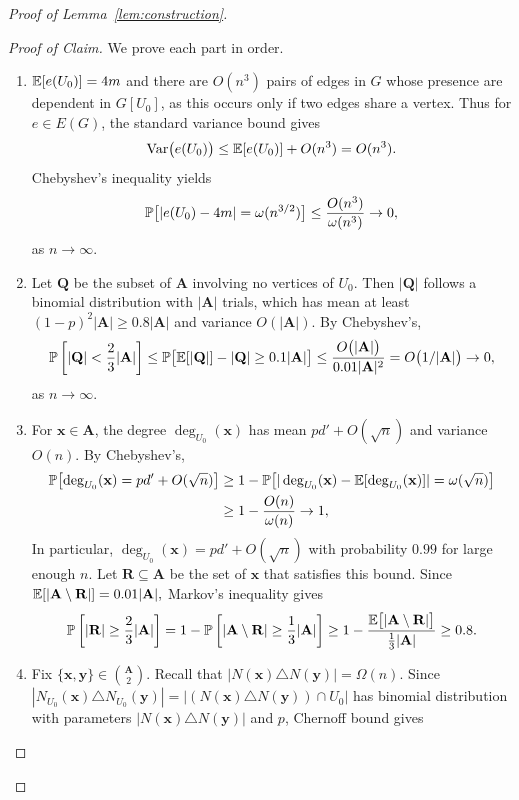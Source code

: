 \begin{proof}[Proof of Lemma~\ref{lem:construction}]
\begin{proof}[Proof of Claim]
  We prove each part in order.
  \begin{enumerate}
    \item[(i)] $\mathbb{E}[e(U_0)] = 4m$ and there are $O(n^3)$ pairs of edges in $G$ whose presence are dependent in $G[U_0]$, as this occurs only if two edges share a vertex. Thus for $e \in E(G)$, the standard variance bound gives
    \[
      \operatorname{Var}\bigl(e(U_0)\bigr) \leq \mathbb{E}[e(U_0)] + O(n^3) = O(n^3).
    \]
    Chebyshev's inequality yields
    \[
      \mathbb{P}\bigl[|e(U_0) - 4m| = \omega(n^{3/2})\bigr] \leq \frac{O(n^3)}{\omega(n^{3})} \to 0,
    \]
    as $n \to \infty$.
    \item[(ii)] Let $\mathbf{Q}$ be the subset of $\mathbf{A}$ involving no vertices of $U_0$. Then $|\mathbf{Q}|$ follows a binomial distribution with $|\mathbf{A}|$ trials, which has mean at least $(1 - p)^2|\mathbf{A}| \geq 0.8|\mathbf{A}|$ and variance $O(|\mathbf{A}|)$. By Chebyshev's,
    \[
      \mathbb{P}\left[|\mathbf{Q}| < \frac{2}{3}|\mathbf{A}|\right] \leq \mathbb{P}\bigl[\mathbb{E}[|\mathbf{Q}|] - |\mathbf{Q}| \geq 0.1|\mathbf{A}|\bigr] \leq \frac{O\bigl(|\mathbf{A}|\bigr)}{0.01|\mathbf{A}|^2} = O\bigl(1/|\mathbf{A}|\bigr) \to 0,
    \]
    as $n \to \infty$. 
    \item[(iii)] For $\mathbf{x} \in \mathbf{A}$, the degree $\deg_{U_0}(\mathbf{x})$ has mean $pd' + O(\sqrt{n})$ and variance $O(n)$. By Chebyshev's, 
    \begin{align*}
      \mathbb{P}\bigl[\operatorname{deg}_{U_0}(\mathbf{x}) = pd' + O(\sqrt{n})\bigr] 
      &\geq 1 - \mathbb{P}\bigl[|\operatorname{deg}_{U_0}(\mathbf{x}) - \mathbb{E}[\operatorname{deg}_{U_0}(\mathbf{x})]| = \omega(\sqrt{n})\bigr] \\
      &\geq 1 - \frac{O(n)}{\omega(n)} \to 1,
    \end{align*}
    In particular, $\deg_{U_0}(\mathbf{x}) = pd' + O(\sqrt{n})$ with probability $0.99$ for large enough $n$. Let $\mathbf{R} \subseteq \mathbf{A}$ be the set of $\mathbf{x}$ that satisfies this bound. Since $\mathbb{E}[|\mathbf{A} \setminus \mathbf{R}|] = 0.01|\mathbf{A}|,$ Markov's inequality gives
    \[
      \mathbb{P}\left[|\mathbf{R}| \geq \frac{2}{3}|\mathbf{A}|\right] = 1 - \mathbb{P}\left[|\mathbf{A} \setminus \mathbf{R}| \geq \frac{1}{3}|\mathbf{A}|\right] \geq 1 - \frac{\mathbb{E}\bigl[|\mathbf{A} \setminus \mathbf{R}|\bigr]}{\frac{1}{3}|\mathbf{A}|} \geq 0.8.
    \]
    \item[(iv)] Fix $\{\mathbf{x}, \mathbf{y}\} \in \binom{\mathbf{A}}{2}$. Recall that $|N(\mathbf{x}) \triangle N(\mathbf{y})| = \Omega(n)$. Since $|N_{U_0}(\mathbf{x}) \triangle N_{U_0}(\mathbf{y})| = |(N(\mathbf{x}) \triangle N(\mathbf{y})) \cap U_0|$ has binomial distribution with parameters $|N(\mathbf{x}) \triangle N(\mathbf{y})|$ and $p$, Chernoff bound gives

\end{enumerate}
\end{proof}
\end{proof}
